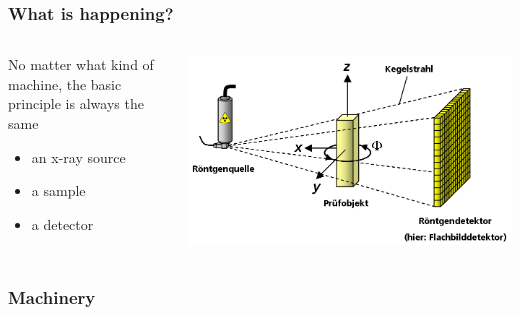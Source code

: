 \begin{frame}
	\frametitle{What is happening?}
	\begin{columns}%
		\begin{column}{0.45\linewidth}%
			No matter what kind of machine, the basic principle is always the same
			\begin{itemize}
				\item an x-ray source
				\item a sample
				\item a detector
			\end{itemize}
		\end{column}%
		\begin{column}{0.45\linewidth}%
			\centering%
			\includegraphics[width=\imwidth]{./images/3D_Computed_Tomography}%
		\end{column}%
	\end{columns}%
\end{frame}

\begin{frame}
	\frametitle{Machinery}
	\begin{columns}
		\begin{column}{0.49\linewidth}
			\centering
			
		\end{column}
		\begin{column}{0.49\linewidth}
			\centering
			\only<1>{}%
			\only<2|handout:0>{}%
			\only<3|handout:0>{}%
		\end{column}
	\end{columns}
\end{frame}

